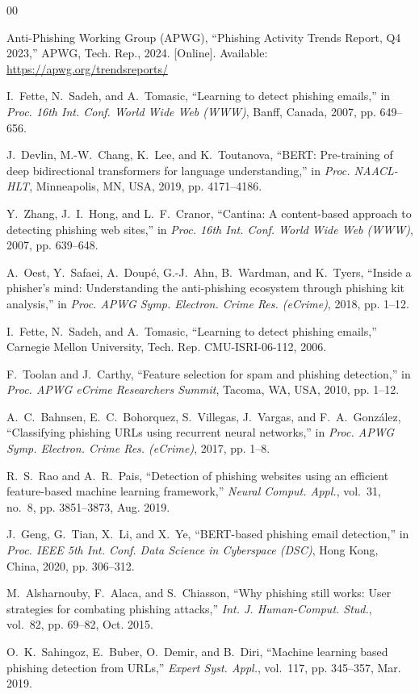 \documentclass[conference]{IEEEtran}
\begin{document}
\begin{thebibliography}{00}

Anti-Phishing Working Group (APWG), ``Phishing Activity Trends
Report, Q4 2023,'' APWG, Tech. Rep., 2024. [Online]. Available:
\url{https://apwg.org/trendsreports/}

I.~Fette, N.~Sadeh, and A.~Tomasic, ``Learning to detect phishing
emails,'' in \textit{Proc. 16th Int. Conf. World Wide Web (WWW)},
Banff, Canada, 2007, pp. 649--656.

J.~Devlin, M.-W.~Chang, K.~Lee, and K.~Toutanova, ``BERT:
Pre-training of deep bidirectional transformers for language
understanding,'' in \textit{Proc. NAACL-HLT}, Minneapolis, MN,
USA, 2019, pp. 4171--4186.

Y.~Zhang, J.~I.~Hong, and L.~F.~Cranor, ``Cantina: A
content-based approach to detecting phishing web sites,'' in
\textit{Proc. 16th Int. Conf. World Wide Web (WWW)}, 2007,
pp. 639--648.

A.~Oest, Y.~Safaei, A.~Doup\'{e}, G.-J.~Ahn, B.~Wardman, and
K.~Tyers, ``Inside a phisher's mind: Understanding the
anti-phishing ecosystem through phishing kit analysis,'' in
\textit{Proc. APWG Symp. Electron. Crime Res. (eCrime)}, 2018,
pp. 1--12.

I.~Fette, N.~Sadeh, and A.~Tomasic, ``Learning to detect phishing
emails,'' Carnegie Mellon University, Tech. Rep.
CMU-ISRI-06-112, 2006.

F.~Toolan and J.~Carthy, ``Feature selection for spam and phishing
detection,'' in \textit{Proc. APWG eCrime Researchers Summit},
Tacoma, WA, USA, 2010, pp. 1--12.

A.~C.~Bahnsen, E.~C.~Bohorquez, S.~Villegas, J.~Vargas, and
F.~A.~Gonz\'{a}lez, ``Classifying phishing URLs using recurrent
neural networks,'' in \textit{Proc. APWG Symp. Electron. Crime
Res. (eCrime)}, 2017, pp. 1--8.

R.~S.~Rao and A.~R.~Pais, ``Detection of phishing websites using
an efficient feature-based machine learning framework,''
\textit{Neural Comput. Appl.}, vol.~31, no.~8, pp. 3851--3873,
Aug. 2019.

J.~Geng, G.~Tian, X.~Li, and X.~Ye, ``BERT-based phishing email
detection,'' in \textit{Proc. IEEE 5th Int. Conf. Data Science in
Cyberspace (DSC)}, Hong Kong, China, 2020, pp. 306--312.

M.~Alsharnouby, F.~Alaca, and S.~Chiasson, ``Why phishing still
works: User strategies for combating phishing attacks,''
\textit{Int. J. Human-Comput. Stud.}, vol.~82, pp. 69--82,
Oct. 2015.

O.~K.~Sahingoz, E.~Buber, O.~Demir, and B.~Diri, ``Machine
learning based phishing detection from URLs,''
\textit{Expert Syst. Appl.}, vol.~117, pp. 345--357, Mar. 2019.

\end{thebibliography}

\balance
\end{document}
